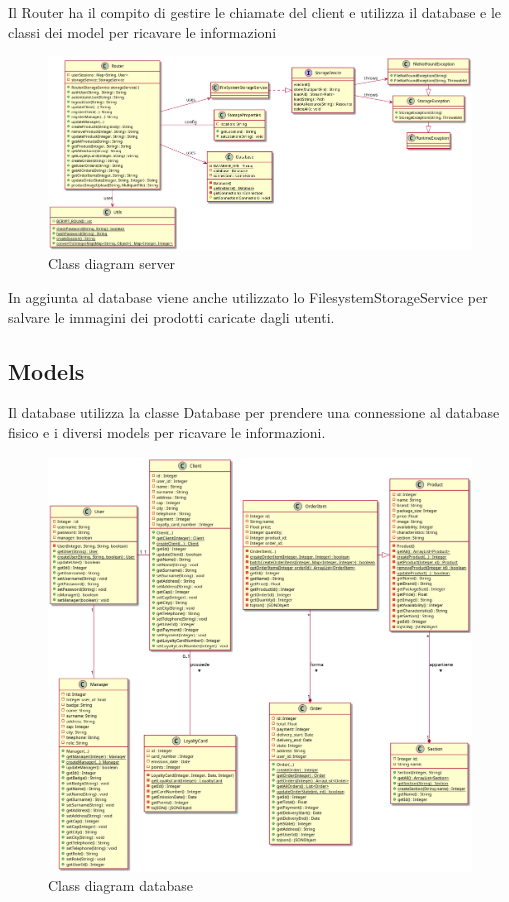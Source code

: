 \documentclass[12pt, a4paper]{article}
\begin{document}
Il Router ha il compito di gestire le chiamate del client e utilizza il database
e le classi dei model per ricavare le informazioni 

\begin{figure}[H]
\centering
\includegraphics[width=\linewidth]{router_class.png}
\caption{Class diagram server}
\end{figure}

In aggiunta al database viene anche utilizzato lo FilesystemStorageService per
salvare le immagini dei prodotti caricate dagli utenti.

\subsection{Models}

Il database utilizza la classe Database per prendere una connessione al database
fisico e i diversi models per ricavare le informazioni.

\begin{figure}[H]
\centering
\includegraphics[width=\linewidth]{database_models_class.png}
\caption{Class diagram database}
\end{figure}
\end{document}
